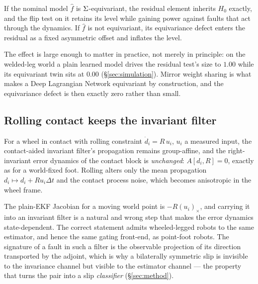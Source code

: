 \begin{proposition}
\label{prop:residual}
If the nominal model $\hat f$ is $\Sigma$-equivariant, the residual element inherits $H_0$ exactly, and the flip test
on it retains its level while gaining power against faults that act through the dynamics. If $\hat f$ is not
equivariant, its equivariance defect enters the residual as a fixed asymmetric offset and inflates the level.
\end{proposition}
The effect is large enough to matter in practice, not merely in principle: on the welded-leg world a plain learned model
drives the residual test's size to $1.00$ while its equivariant twin sits at $0.00$ (\S\ref{sec:simulation}). Mirror
weight sharing is what makes a Deep Lagrangian Network equivariant by construction, and the equivariance defect is then
exactly zero rather than small.

\subsection{Rolling contact keeps the invariant filter}

\begin{proposition}
\label{prop:rolling}
For a wheel in contact with rolling constraint $\dot d_i=R\,u_i$, $u_i$ a measured input, the contact-aided invariant
filter's propagation remains group-affine, and the right-invariant error dynamics of the contact block is
\emph{unchanged}: $A[d_i,R]=0$, exactly as for a world-fixed foot. Rolling alters only the mean propagation
$d_i\mapsto d_i+Ru_i\Delta t$ and the contact process noise, which becomes anisotropic in the wheel frame.
\end{proposition}
The plain-EKF Jacobian for a moving world point is $-R(u_i)_\times$, and carrying it into an invariant filter is a
natural and wrong step that makes the error dynamics state-dependent. The correct statement admits wheeled-legged
robots to the same estimator, and hence the same gating front-end, as point-foot robots. The signature of a fault in
such a filter is the observable projection of its direction transported by the adjoint, which is why a bilaterally
symmetric slip is invisible to the invariance channel but visible to the estimator channel --- the property that turns
the pair into a slip \emph{classifier} (\S\ref{sec:method}).
